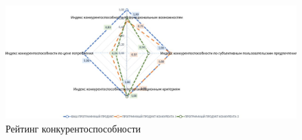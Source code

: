 \begin{figure}[htb]
	\centering
	\includegraphics[width=.95\textwidth]{images/kk.jpg}
	\parskip=6pt
	\caption{Рейтинг конкурентоспособности}
	\label{fig:index_diagram}
\end{figure}











